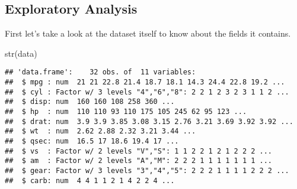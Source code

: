 \documentclass[
]{article}
\newenvironment{Shaded}{\begin{snugshade}}{\end{snugshade}}
\newcommand{\FunctionTok}[1]{\textcolor[rgb]{0.00,0.00,0.00}{#1}}
\newcommand{\NormalTok}[1]{#1}
\newcommand{\OtherTok}[1]{\textcolor[rgb]{0.56,0.35,0.01}{#1}}
\newcommand{\SpecialCharTok}[1]{\textcolor[rgb]{0.00,0.00,0.00}{#1}}
\newcommand{\StringTok}[1]{\textcolor[rgb]{0.31,0.60,0.02}{#1}}
\begin{document}
\begin{Shaded}
\end{Shaded}

\hypertarget{exploratory-analysis}{%
\subsection{Exploratory Analysis}\label{exploratory-analysis}}

First let's take a look at the dataset itself to know about the fields
it contains.

\begin{Shaded}
\begin{Highlighting}[]
\FunctionTok{str}\NormalTok{(data)}
\end{Highlighting}
\end{Shaded}

\begin{verbatim}
## 'data.frame':    32 obs. of  11 variables:
##  $ mpg : num  21 21 22.8 21.4 18.7 18.1 14.3 24.4 22.8 19.2 ...
##  $ cyl : Factor w/ 3 levels "4","6","8": 2 2 1 2 3 2 3 1 1 2 ...
##  $ disp: num  160 160 108 258 360 ...
##  $ hp  : num  110 110 93 110 175 105 245 62 95 123 ...
##  $ drat: num  3.9 3.9 3.85 3.08 3.15 2.76 3.21 3.69 3.92 3.92 ...
##  $ wt  : num  2.62 2.88 2.32 3.21 3.44 ...
##  $ qsec: num  16.5 17 18.6 19.4 17 ...
##  $ vs  : Factor w/ 2 levels "V","S": 1 1 2 2 1 2 1 2 2 2 ...
##  $ am  : Factor w/ 2 levels "A","M": 2 2 2 1 1 1 1 1 1 1 ...
##  $ gear: Factor w/ 3 levels "3","4","5": 2 2 2 1 1 1 1 2 2 2 ...
##  $ carb: num  4 4 1 1 2 1 4 2 2 4 ...
\end{verbatim}
\end{document}
